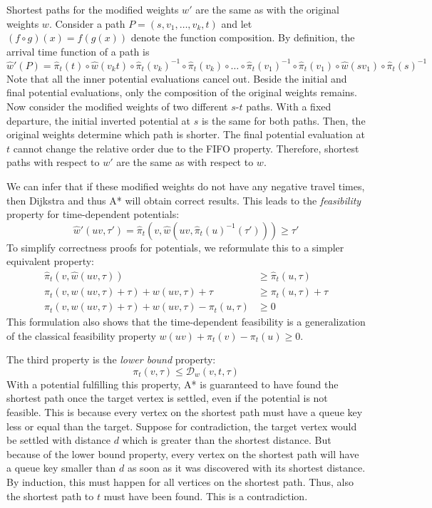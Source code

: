 \documentclass[a4paper,UKenglish,cleveref, autoref, thm-restate,anonymous]{lipics-v2021}
\newcommand*{\dist}{\mathcal{D}}
\begin{document}
Shortest paths for the modified weights $w'$ are the same as with the original weights $w$.
Consider a path $P = (s,v_1,\dots,v_k,t)$ and let $(f \circ g)(x) = f(g(x))$ denote the function composition.
By definition, the arrival time function of a path is
\[
\hat{w}'(P) = \hat{\pi}_t(t) \circ \hat{w}(v_k t) \circ \hat{\pi}_t(v_k)^{-1}
\circ \hat{\pi}_t(v_k) \circ \dots \circ \hat{\pi}_t(v_1)^{-1} \circ
\hat{\pi}_t(v_1) \circ \hat{w}(s v_1) \circ \hat{\pi}_t(s)^{-1}
\]
Note that all the inner potential evaluations cancel out.
Beside the initial and final potential evaluations, only the composition of the original weights remains.
Now consider the modified weights of two different $s$-$t$ paths.
With a fixed departure, the initial inverted potential at $s$ is the same for both paths.
Then, the original weights determine which path is shorter.
The final potential evaluation at $t$ cannot change the relative order due to the FIFO property.
Therefore, shortest paths with respect to $w'$ are the same as with respect to $w$.

We can infer that if these modified weights do not have any negative travel times, then Dijkstra and thus A* will obtain correct results. %
This leads to the \emph{feasibility} property for time-dependent potentials:
\[
\hat{w}'(uv, \tau') = \hat{\pi}_t(v, \hat{w}(uv, \hat{\pi}_t(u)^{-1}(\tau'))) \geq \tau'
\]
To simplify correctness proofs for potentials, we reformulate this to a simpler equivalent property:
\begin{align*}
\hat{\pi}_t(v, \hat{w}(uv, \tau)) & \geq \hat{\pi}_t(u, \tau) \\
\pi_t(v, w(uv, \tau) + \tau) + w(uv, \tau) + \tau & \geq \pi_t(u, \tau) + \tau \\
\pi_t(v, w(uv, \tau) + \tau) + w(uv, \tau) - \pi_t(u, \tau) & \geq 0
\end{align*}
This formulation also shows that the time-dependent feasibility is a generalization of the classical feasibility property $w(uv) + \pi_t(v) - \pi_t(u) \geq 0$.

The third property is the \emph{lower bound} property:
\[
\pi_t(v, \tau) \leq \dist_w(v,t,\tau)
\]
With a potential fulfilling this property, A* is guaranteed to have found the shortest path once the target vertex is settled, even if the potential is not feasible.
This is because every vertex on the shortest path must have a queue key less or equal than the target.
Suppose for contradiction, the target vertex would be settled with distance $d$ which is greater than the shortest distance.
But because of the lower bound property, every vertex on the shortest path will have a queue key smaller than $d$ as soon as it was discovered with its shortest distance.
By induction, this must happen for all vertices on the shortest path.
Thus, also the shortest path to $t$ must have been found.
This is a contradiction.
\end{document}
